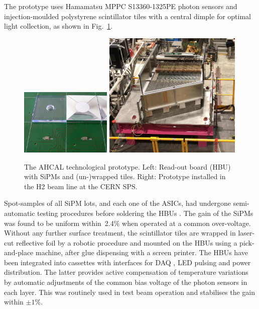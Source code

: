 The prototype uses Hamamatsu MPPC S13360-1325PE photon sensors and injection-moulded polystyrene scintillator tiles with a central dimple \cite{Liu:2015cpe} for optimal light collection, as shown in Fig.~\ref{fig:AHCAL-TileProto}. 
\begin{figure}[hbt]
\centering
\includegraphics[width=0.39\textwidth]{Detector/fig/hcal-tiles.jpeg}
\includegraphics[width=0.59\textwidth]{Detector/fig/AHCAL-prototype.jpeg}
\caption{The AHCAL technological prototype. Left: Read-out board (HBU) with SiPMs and (un-)wrapped tiles. Right: Prototype installed in the H2 beam line at the CERN SPS.} 
\label{fig:AHCAL-TileProto}
\end{figure}
%
Spot-samples of all SiPM lots, and each one of the ASICs, had undergone semi-automatic testing procedures before soldering the HBUs \cite{Munwes:2634923}. The gain of the SiPMs was found to be uniform within~2.4\% when operated at a common over-voltage.
Without any further surface treatment, the scintillator tiles are wrapped in laser-cut reflective foil by a robotic procedure and mounted on the HBUs using a pick-and-place machine, after glue dispensing with a screen printer.   
%
The HBUs have been integrated into cassettes with interfaces for DAQ \cite{Kvasnicka:2017bpx}, LED pulsing and power distribution. The latter provides active compensation of temperature variations by automatic adjustments of the common bias voltage of the photon sensors in each layer. This was routinely used in test beam operation and stabilises the gain within $\pm 1\%$.
